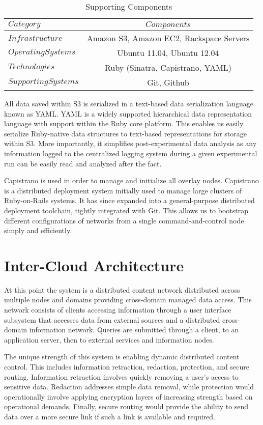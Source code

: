 \begin{table*}[tp] %
\centering %
\begin{tabular}{lc}
\toprule %
$Category$ 				& $Components$ 								\\\toprule %
$Infrastructure$ 		& Amazon S3, Amazon EC2, Rackspace Servers 	\\\midrule
$Operating Systems$		& Ubuntu 11.04, Ubuntu 12.04 				\\\midrule
$Technologies$			& Ruby (Sinatra, Capistrano, YAML) 			\\\midrule
$Supporting Systems$		& Git, Github 								\\\bottomrule
\end{tabular}
\caption{Supporting Components}
\label{table:model:components}
\end{table*}

All data saved within S3 is serialized in a text-based data serialization language known as YAML.  YAML is a widely supported hierarchical data representation language with support within the Ruby core platform.  This enables us easily serialize Ruby-native data structures to text-based representations for storage within S3.  More importantly, it simplifies post-experimental data analysis as any information logged to the centralized logging system during a given experimental run can be easily read and analyzed after the fact.

Capistrano is used in order to manage and initialize all overlay nodes.  Capistrano is a distributed deployment system initially used to manage large clusters of Ruby-on-Rails systems.  It has since expanded into a general-purpose distributed deployment toolchain, tightly integrated with Git.  This allows us to bootstrap different configurations of networks from a single command-and-control node simply and efficiently.

\section{Inter-Cloud Architecture}
At this point the system is a distributed content network distributed across multiple nodes and domains providing cross-domain managed data access.  This network consists of clients accessing information through a user interface subsystem that accesses data from external sources and a distributed cross-domain information network.  Queries are submitted through a client, to an application server, then to external services and information nodes.

The unique strength of this system is enabling dynamic distributed content control.  This includes information retraction, redaction, protection, and secure routing.  Information retraction involves quickly removing a user's access to sensitive data.  Redaction addresses simple data removal, while protection would operationally involve applying encryption layers of increasing strength based on operational demands.  Finally, secure routing would provide the ability to send data over a more secure link if such a link is available and required.

